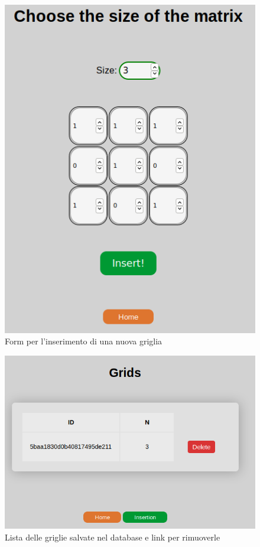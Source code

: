 	\begin{figure}[ht]
	\centering
	\includegraphics[width=0.7\linewidth]{Images/addtable}
	\caption{Form per l'inserimento di una nuova griglia}
	\label{fig:home}
\end{figure}
	\begin{figure}[ht]
	\centering
	\includegraphics[width=0.7\linewidth]{Images/viewrem}
	\caption{Lista delle griglie salvate nel database e link per rimuoverle}
	\label{fig:home}
\end{figure}
\newpage

